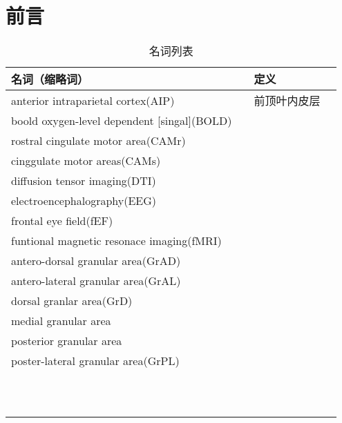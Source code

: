 \chapter{前言} \label{chap:preface}
\begin{table}[htbp]
	\newcommand{\tabincell}[2]{\begin{tabular}{@{}#1@{}}#2\end{tabular}} %
	\centering
	\caption{名词列表}
	\renewcommand\arraystretch{1.0}	%
	\begin{tabular}{llll}
		\toprule 
		 名词（缩略词）   && 定义 \\
		\midrule
		anterior intraparietal cortex(AIP)   &&前顶叶内皮层  \\
		\midrule
		boold oxygen-level dependent [singal](BOLD)     &&   \\
		\midrule
		rostral cingulate motor area(CAMr)     &&   \\
		\midrule
		cinggulate motor areas(CAMs)      &&   \\
		\midrule
		diffusion tensor imaging(DTI)       &&   \\
		\midrule
		electroencephalography(EEG)       &&   \\
		\midrule
		frontal eye field(fEF)       &&   \\
		\midrule
		funtional magnetic resonace imaging(fMRI)       &&   \\
		\midrule
		antero-dorsal granular area(GrAD)      &&   \\
        \midrule
        antero-lateral granular area(GrAL)       &&   \\
        \midrule
        dorsal granlar area(GrD)      &&   \\
        \midrule
        medial granular area       &&   \\
        \midrule
        posterior granular area       &&   \\
        \midrule
        poster-lateral granular area(GrPL)       &&   \\
        \midrule
               &&   \\
        \midrule
               &&   \\
        \midrule
               &&   \\
        \midrule
               &&   \\
        \midrule
               &&   \\
        \midrule
               &&   \\
       \midrule
              &&   \\
       \midrule
             &&   \\
       \midrule
       &       &&   \\
       \midrule
       &       &&   \\
       \midrule
       &       &&   \\
		

\end{tabular}
\end{table}
